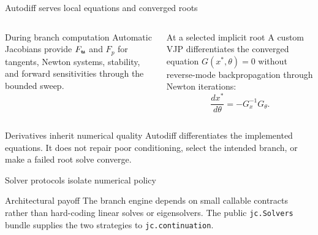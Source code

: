\begin{frame}{Autodiff serves local equations and converged roots}
\begin{columns}[T]
\begin{block}{During branch computation}
Automatic Jacobians provide $F_{\bm{u}}$ and $F_p$ for tangents, Newton
systems, stability, and forward sensitivities through the bounded sweep.
\end{block}
\begin{block}{At a selected implicit root}
A custom VJP differentiates the converged equation $G(x^*,\theta)=0$ without
reverse-mode backpropagation through Newton iterations:
\[
  \frac{dx^*}{d\theta}=-G_x^{-1}G_\theta.
\]
\end{block}
\end{columns}
\vspace{4mm}
\begin{alertblock}{Derivatives inherit numerical quality}
Autodiff differentiates the implemented equations. It does not repair poor
conditioning, select the intended branch, or make a failed root solve converge.
\end{alertblock}
\end{frame}

\begin{frame}{Solver protocols isolate numerical policy}
\centering
{}
\vspace{6mm}
\begin{block}{Architectural payoff}
The branch engine depends on small callable contracts rather than hard-coding
linear solves or eigensolvers. The public \texttt{jc.Solvers} bundle supplies
the two strategies to \texttt{jc.continuation}.
\end{block}
\end{frame}

